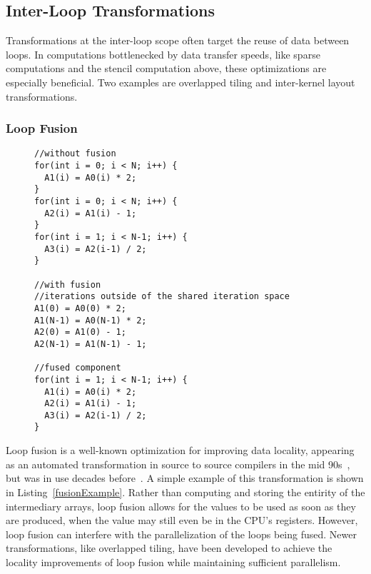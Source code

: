 \subsection{Inter-Loop Transformations}
Transformations at the inter-loop scope often target the reuse of data between loops.
In computations bottlenecked by data transfer speeds, like sparse computations and the stencil computation above, these optimizations are especially beneficial. 
Two examples are overlapped tiling and inter-kernel layout transformations.

\subsubsection{Loop Fusion}
\begin{figure}
\begin{lstlisting}[caption={Three loops, with and without loop fusion.},label=fusionExample]
//without fusion
for(int i = 0; i < N; i++) {
  A1(i) = A0(i) * 2;
}
for(int i = 0; i < N; i++) {
  A2(i) = A1(i) - 1;
}
for(int i = 1; i < N-1; i++) {
  A3(i) = A2(i-1) / 2;
}

//with fusion
//iterations outside of the shared iteration space
A1(0) = A0(0) * 2;
A1(N-1) = A0(N-1) * 2;
A2(0) = A1(0) - 1;
A2(N-1) = A1(N-1) - 1;

//fused component
for(int i = 1; i < N-1; i++) {
  A1(i) = A0(i) * 2;
  A2(i) = A1(i) - 1;
  A3(i) = A2(i-1) / 2;
}
\end{lstlisting}
\end{figure}

Loop fusion is a well-known optimization for improving data locality, appearing as an automated transformation in source to source compilers in the mid 90s~\cite{mckinley1996improving}, but was in use decades before~\cite{warren1984hierarchical,cocke1971catalogue}.
A simple example of this transformation is shown in Listing~\ref{fusionExample}.
Rather than computing and storing the entirity of the intermediary arrays, loop fusion allows for the values to be used as soon as they are produced, when the value may still even be in the CPU's registers.
However, loop fusion can interfere with the parallelization of the loops being fused.
Newer transformations, like overlapped tiling, have been developed to achieve the locality improvements of loop fusion while maintaining sufficient parallelism.

